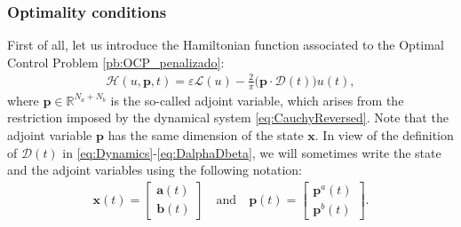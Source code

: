 \documentclass[twocolumn]{autart}    %
\begin{document}
\subsubsection{Optimality conditions}

First of all, let us introduce the Hamiltonian function associated to the Optimal Control Problem \ref{pb:OCP_penalizado}:
\begin{align}\label{eq:hamil}
    \mathcal{H}(u,\bm{p},t) = \varepsilon \mathcal{L}(u) - \frac 2\pi\big(\bm{p} \cdot \bm{\mathcal{D}}(t)\big)u(t),
\end{align}
where $\bm{p}\in \mathbb{R}^{N_a+N_b}$ is the so-called adjoint variable, which arises from the restriction imposed by the dynamical system \eqref{eq:CauchyReversed}. Note that the adjoint variable $\bm{p}$ has the same dimension of the state $\bm{x}$. In view of the definition of $\bm{\mathcal{D}}(t)$ in \eqref{eq:Dynamics}-\eqref{eq:DalphaDbeta}, we will sometimes write the state and the adjoint variables using the following notation:
\begin{align*}
  \bm{x}(t) = \begin{bmatrix} \bm{a}(t) \\ \bm{b}(t) \end{bmatrix} \quad \text{and}\quad
  \bm{p}(t) = \begin{bmatrix} \bm{p}^a(t) \\ \bm{p}^b(t) \end{bmatrix}.
\end{align*}
\end{document}
